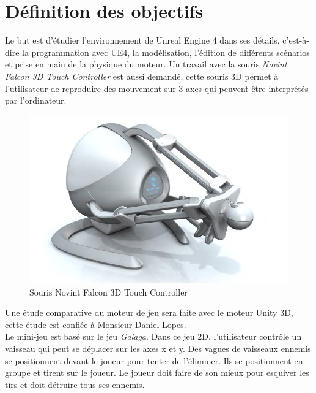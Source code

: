 \documentclass[11pt, a4paper, oneside]{article}
\begin{document}
\section{Définition des objectifs}
Le but est d'étudier l'environnement de Unreal Engine 4 dans ses détails, c'est-à-dire la programmation avec UE4, la modélisation, l'édition de différents scénarios et prise en main de la physique du moteur. Un travail avec la souris \textit{Novint Falcon 3D Touch Controller} est aussi demandé, cette souris 3D permet à l'utilisateur de reproduire des mouvement sur 3 axes qui peuvent être interprétés par l'ordinateur.

\begin{figure}[h]
	\begin{center}
	\includegraphics[scale=.4]{falcon}
	\caption{Souris Novint Falcon 3D Touch Controller}
	\end{center}
\end{figure}

Une étude comparative du moteur de jeu sera faite avec le moteur Unity 3D, cette étude est confiée à Monsieur Daniel Lopes.\\[0.3cm]
Le mini-jeu est basé sur le jeu \textit{Galaga}. Dans ce jeu 2D, l'utilisateur contrôle un vaisseau qui peut se déplacer sur les axes x et y. Des vagues de vaisseaux ennemis se positionnent devant le joueur pour tenter de l'éliminer. Ils se positionnent en groupe et tirent sur le joueur. Le joueur doit faire de son mieux pour esquiver les tirs et doit détruire tous ses ennemis.
\end{document}

